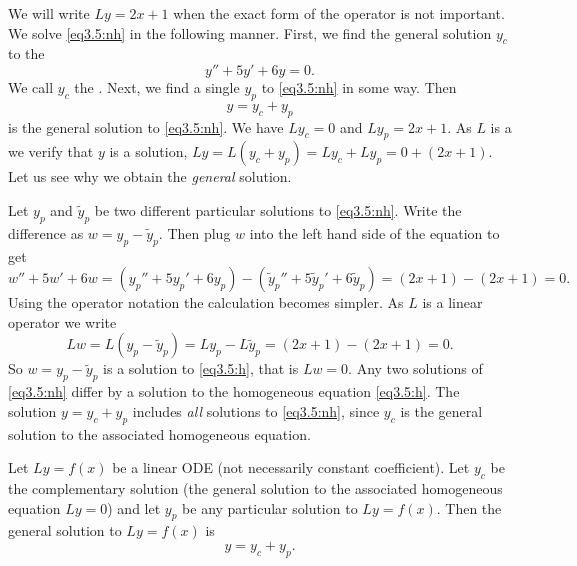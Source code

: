 We will write $Ly = 2x+1$ when the exact form of the operator is not
important.
We solve \eqref{eq3.5:nh} in the following manner.  First, we find the general
solution $y_c$
to the \emph{}
\begin{equation} \label{eq3.5:h}
y'' + 5y'+ 6y = 0 .
\end{equation}
We call $y_c$ the \emph{}.
Next, we find a
single \emph{} $y_p$ to \eqref{eq3.5:nh} in some
way.  Then
\begin{equation*}
y = y_c + y_p
\end{equation*}
is the general solution to \eqref{eq3.5:nh}.  
We have $L y_c = 0$ and $L y_p = 2x+1$.  As
$L$ is a \emph{}
we verify that $y$ is a solution, $L y = L ( y_c + y_p) = L y_c + L y_p = 0
+ (2x+1)$.  Let us see
why we obtain the \emph{general} solution.

Let $y_p$ and $\tilde{y}_p$ be two different
particular solutions 
to \eqref{eq3.5:nh}.
Write the difference as
$w = y_p - \tilde{y}_p$.  Then plug $w$
into the left hand side of the equation to get
\begin{equation*}
w'' + 5w'+ 6w =
(y_p'' + 5y_p'+ 6y_p) -
(\tilde{y}_p'' + 5\tilde{y}_p'+ 6\tilde{y}_p) =
(2x+1) - (2x+1) = 0 .
\end{equation*}
Using the operator notation the calculation becomes simpler.
As $L$ is a linear operator we write
\begin{equation*}
Lw = L(y_p - \tilde{y}_p) =
Ly_p - L\tilde{y}_p =
(2x+1)-(2x+1) = 0 .
\end{equation*}
So $w = y_p - \tilde{y}_p$ is a solution to \eqref{eq3.5:h}, that is
$Lw = 0$.  Any two
solutions of \eqref{eq3.5:nh} differ by a solution to the homogeneous
equation \eqref{eq3.5:h}.  The solution $y = y_c + y_p$ includes \emph{all}
solutions to \eqref{eq3.5:nh},
since $y_c$ is the general solution to the associated homogeneous equation.

\begin{theorem}
Let $Ly=f(x)$ be a linear ODE (not necessarily constant
coefficient).  Let $y_c$ be the complementary solution
(the general
solution to the associated homogeneous equation $Ly = 0$) and let $y_p$
be any particular solution to $Ly=f(x)$.  Then the general
solution to $Ly=f(x)$ is
\begin{equation*}
y = y_c + y_p.
\end{equation*}
\end{theorem}

